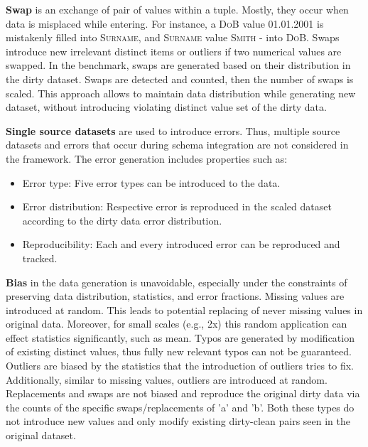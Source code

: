 \textbf{Swap} is an exchange of pair of values within a tuple. 
Mostly, they occur when data is misplaced while entering.
For instance, a \textsc{DoB} value \textsc{01.01.2001} is mistakenly filled into \textsc{Surname}, and \textsc{Surname} value \textsc{Smith} - into \textsc{DoB}.
Swaps introduce new irrelevant distinct items or outliers if two numerical values are swapped.
In the benchmark, swaps are generated based on their distribution in the dirty dataset. Swaps are detected and counted, then the number of swaps is scaled. This approach allows to maintain data distribution while generating new dataset, without introducing violating distinct value set of the dirty data.

\textbf{Single source datasets} are used to introduce errors. 
Thus, multiple source datasets and errors that occur during schema integration are not considered in the framework.
The error generation includes properties such as:
\begin{itemize}
    \item Error type: Five error types can be introduced to the data.
    \item Error distribution: Respective error is reproduced in the scaled dataset according to the dirty data error distribution.
    \item Reproducibility: Each and every introduced error can be reproduced and tracked.
\end{itemize}

\textbf{Bias} in the data generation is unavoidable, especially under the constraints of preserving data distribution, statistics, and error fractions. 
Missing values are introduced at random. This leads to potential replacing of never missing values in original data.
Moreover, for small scales (e.g., 2x) this random application can effect statistics significantly, such as mean.
Typos are generated by modification of existing distinct values, thus fully new relevant typos can not be guaranteed.
Outliers are biased by the statistics that the introduction of outliers tries to fix.
Additionally, similar to missing values, outliers are introduced at random.
Replacements and swaps are not biased and reproduce the original dirty data via the counts of the specific swaps/replacements of 'a' and 'b'.
Both these types do not introduce new values and only modify existing dirty-clean pairs seen in the original dataset.
